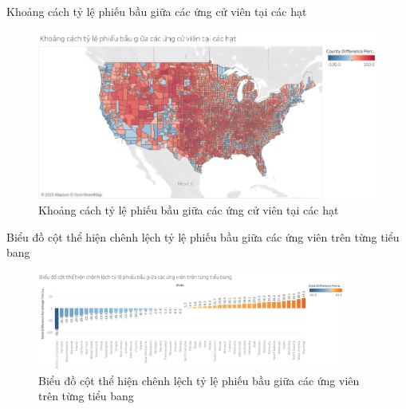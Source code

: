 \documentclass[10pt]{beamer}
\theoremstyle{remark}
\theoremstyle{definition}
\begin{document}
\begin{frame}{Khoảng cách tỷ lệ phiếu bầu giữa các ứng cử viên tại các hạt}
	\begin{figure}[h!]
        \centering
        \includegraphics[width=\textwidth]{figures/County_Difference_Percentage_Total_Vote_Two_Candidate.png}
        \caption{Khoảng cách tỷ lệ phiếu bầu giữa các ứng cử viên tại các hạt}
    \end{figure}
\end{frame}



\begin{frame}{Biểu đồ cột thể hiện chênh lệch tỷ lệ phiếu bầu giữa các ứng viên trên từng tiểu bang}
	\begin{figure}[h!]
		\centering
		\includegraphics[width=0.9\textwidth]{figures/State_Difference_Percentage_Total_Vote_Two_Candidate_Bar_Chart.png}
		\caption{Biểu đồ cột thể hiện chênh lệch tỷ lệ phiếu bầu giữa các ứng viên trên từng tiểu bang}
	\end{figure}
\end{frame}
\end{document}
